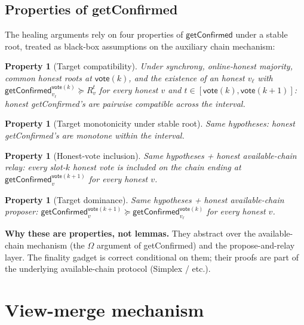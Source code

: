 \documentclass{article}
\newcommand{\vote}{\mathsf{vote}}
\newcommand{\OHM}{online-honest majority\xspace}
\newcommand{\HAP}{honest available-chain proposer\xspace}
\newcommand{\HAR}{honest available-chain relay\xspace}
\newcommand{\getConfirmed}{\textsf{getConfirmed}\xspace}
\theoremstyle{plain}
\newtheorem{property}[theorem]{Property}
\theoremstyle{definition}
\theoremstyle{remark}
\renewcommand{\paragraph}[1]{\vspace{6pt}\noindent\textbf{#1}}
\begin{document}
\subsection{Properties of \getConfirmed}\label{sec:gc-properties}

The healing arguments rely on four properties of $\getConfirmed$ under a stable root, treated as black-box assumptions on the auxiliary chain mechanism:

\begin{property}[Target compatibility]\label{prop:gc-compat}
Under synchrony, \OHM, common honest roots at $\vote(k)$, and the existence of an honest $v_\ell$ with $\getConfirmed_{v_\ell}^{\vote(k)} \succeq R_v^t$ for every honest $v$ and $t \in [\vote(k), \vote(k+1)]$: honest \getConfirmed's are pairwise compatible across the interval.
\end{property}

\begin{property}[Target monotonicity under stable root]\label{prop:gc-mono} Same hypotheses: honest \getConfirmed's are monotone within the interval. \end{property}

\begin{property}[Honest-vote inclusion]\label{prop:gc-inclusion} Same hypotheses + \HAR: every slot-$k$ honest vote is included on the chain ending at $\getConfirmed_v^{\vote(k+1)}$ for every honest $v$. \end{property}

\begin{property}[Target dominance]\label{prop:gc-dominance} Same hypotheses + \HAP: $\getConfirmed_v^{\vote(k+1)} \succeq \getConfirmed_{v_\ell}^{\vote(k)}$ for every honest $v$. \end{property}

\paragraph{Why these are properties, not lemmas.} They abstract over the available-chain mechanism (the $\Omega$ argument of \getConfirmed) and the propose-and-relay layer. The finality gadget is correct conditional on them; their proofs are part of the underlying available-chain protocol (Simplex / etc.).

\appendix
\section{View-merge mechanism}\label{app:view-merge}
\end{document}
